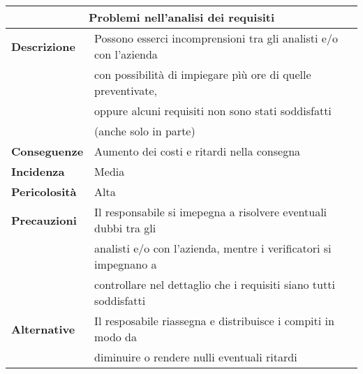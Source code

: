 \begin{center}
    \begin{tabularx}{0.8\linewidth}{l|l}
        \multicolumn{2}{c}{\textbf{Problemi nell'analisi dei requisiti}}                                       \\
        \hline{\textbf{Descrizione}}    & Possono esserci incomprensioni tra gli analisti e/o con l'azienda    \\
                                        & con possibilità di impiegare pìù ore di quelle preventivate,         \\
                                        & oppure alcuni requisiti non sono stati soddisfatti                   \\
                                        & (anche solo in parte) 
                                        \\                                 
        \textbf{Conseguenze}            & Aumento dei costi e ritardi nella consegna                           \\
        \textbf{Incidenza}              & Media                                                                \\
        \textbf{Pericolosità}           & Alta                                                                 \\
        \textbf{Precauzioni}            & Il responsabile si imepegna a risolvere eventuali dubbi tra gli      \\
                                        & analisti e/o con l'azienda, mentre i verificatori si impegnano a     \\
                                        & controllare nel dettaglio che i requisiti siano tutti soddisfatti    \\
        \textbf{Alternative}            & Il resposabile riassegna e distribuisce i compiti in modo da         \\ 
                                        & diminuire o rendere nulli eventuali ritardi                          \\ 
    \end{tabularx}
\end{center}



